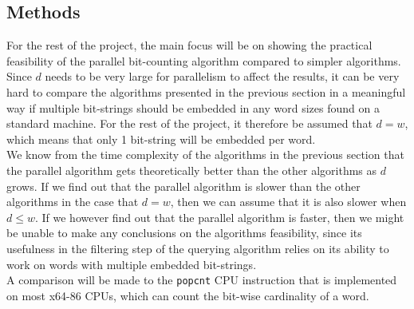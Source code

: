 
\subsection{Methods}
% 
For the rest of the project, the main focus will be on showing the practical feasibility of the parallel bit-counting algorithm compared to simpler algorithms. 
Since $d$ needs to be very large for parallelism to affect the results, it can be very hard to compare the algorithms presented in the previous section in a meaningful way if multiple bit-strings should be embedded in any word sizes found on a standard machine. For the rest of the project, it therefore be assumed that $d=w$, which means that only 1 bit-string will be embedded per word.\\
We know from the time complexity of the algorithms in the previous section that the parallel algorithm gets theoretically better than the other algorithms as $d$ grows. If we find out that the parallel algorithm is slower than the other algorithms in the case that $d=w$, then we can assume that it is also slower when $d \leq w$. If we however find out that the parallel algorithm is faster, then we might be unable to make any conclusions on the algorithms feasibility, since its usefulness in the filtering step of the querying algorithm relies on its ability to work on words with multiple embedded bit-strings. \\
A comparison will be made to the \texttt{popcnt} CPU instruction that is implemented on most x64-86 CPUs, which can count the bit-wise cardinality of a word\cite{popcnt}.

